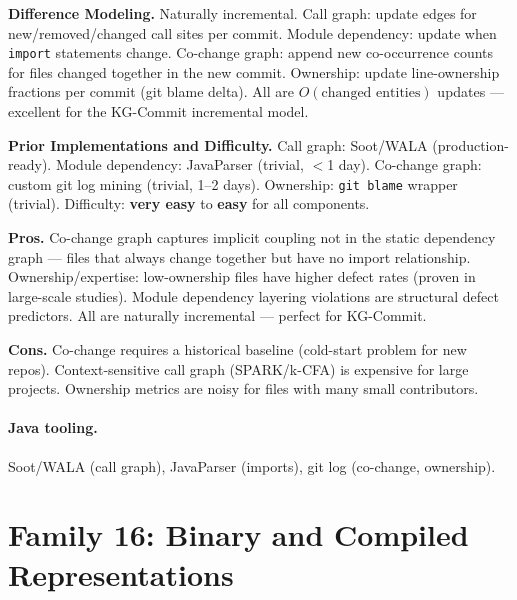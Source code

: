 \documentclass[12pt,a4paper]{article}
\begin{document}
\begin{diffbox}
\textbf{Difference Modeling.}
Naturally incremental. Call graph: update edges for new/removed/changed call
sites per commit. Module dependency: update when \texttt{import} statements
change. Co-change graph: append new co-occurrence counts for files changed
together in the new commit. Ownership: update line-ownership fractions per
commit (git blame delta). All are $O(\text{changed entities})$ updates ---
excellent for the KG-Commit incremental model.
\end{diffbox}

\begin{implbox}
\textbf{Prior Implementations and Difficulty.}
Call graph: Soot/WALA (production-ready). Module dependency: JavaParser
(trivial, $<$1 day). Co-change graph: custom git log mining (trivial, 1--2
days). Ownership: \texttt{git blame} wrapper (trivial). Difficulty:
\textbf{very easy} to \textbf{easy} for all components.
\end{implbox}

\begin{prosbox}
\textbf{Pros.}
Co-change graph captures implicit coupling not in the static dependency graph
--- files that always change together but have no import relationship.
Ownership/expertise: low-ownership files have higher defect rates (proven in
large-scale studies). Module dependency layering violations are structural
defect predictors. All are naturally incremental --- perfect for KG-Commit.
\end{prosbox}

\begin{consbox}
\textbf{Cons.}
Co-change requires a historical baseline (cold-start problem for new repos).
Context-sensitive call graph (SPARK/k-CFA) is expensive for large projects.
Ownership metrics are noisy for files with many small contributors.
\end{consbox}

\paragraph{Java tooling.} Soot/WALA (call graph), JavaParser (imports),
git log (co-change, ownership).

\section{Family 16: Binary and Compiled Representations}
\end{document}
